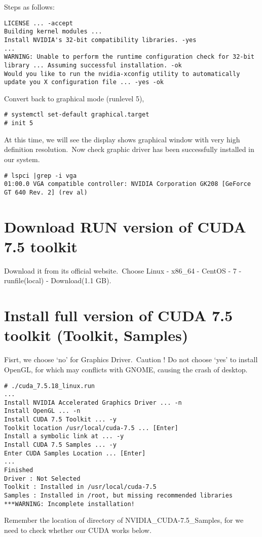 \documentclass[UTF8,a4paper,12pt]{article}
\begin{document}
Steps as follows:
\begin{lstlisting}
LICENSE ... -accept
Building kernel modules ...
Install NVIDIA's 32-bit compatibility libraries. -yes
...
WARNING: Unable to perform the runtime configuration check for 32-bit library ... Assuming successful installation. -ok
Would you like to run the nvidia-xconfig utility to automatically update you X configuration file ... -yes -ok
\end{lstlisting}
Convert back to graphical mode (runlevel 5),
\begin{lstlisting}
# systemctl set-default graphical.target
# init 5
\end{lstlisting}
At this time, we will see the display shows graphical window with very high definition resolution.~Now check graphic driver has been successfully installed in our system.
\begin{lstlisting}
# lspci |grep -i vga
01:00.0 VGA compatible controller: NVIDIA Corporation GK208 [GeForce GT 640 Rev. 2] (rev al)
\end{lstlisting}

\section{Download RUN version of CUDA 7.5 toolkit}
Download it from its official website.~Choose Linux - x86\_64 - CentOS - 7 - runfile(local) -  Download(1.1 GB).

\section{Install full version of CUDA 7.5 toolkit (Toolkit, Samples)}
Fisrt, we choose `no' for Graphics Driver.~Caution ! Do not choose `yes' to install OpenGL, for which may conflicts with GNOME, causing  the crash of desktop.
\begin{lstlisting}
# ./cuda_7.5.18_linux.run
...
Install NVIDIA Accelerated Graphics Driver ... -n
Install OpenGL ... -n
Install CUDA 7.5 Toolkit ... -y
Toolkit location /usr/local/cuda-7.5 ... [Enter]
Install a symbolic link at ... -y
Install CUDA 7.5 Samples ... -y
Enter CUDA Samples Location ... [Enter]
...
Finished 
Driver : Not Selected
Toolkit : Installed in /usr/local/cuda-7.5
Samples : Installed in /root, but missing recommended libraries
***WARNING: Incomplete installation!
\end{lstlisting}
Remember the location of directory of NVIDIA\_CUDA-7.5\_Samples, for we need to check whether our CUDA  works below.
\end{document}
